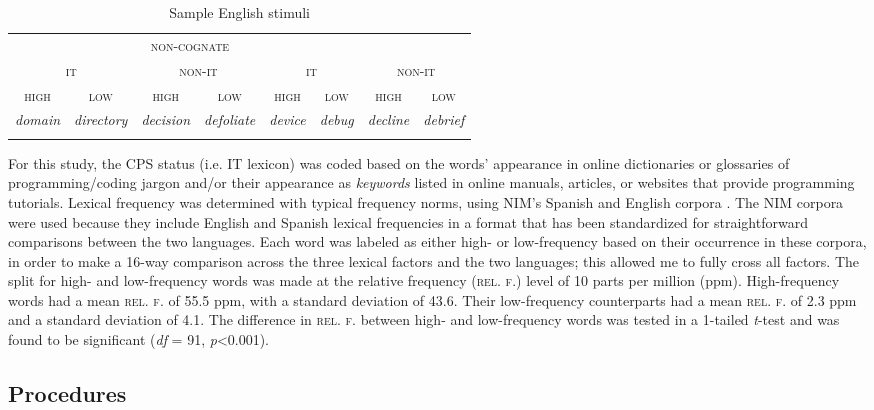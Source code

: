 \documentclass[output=paper,colorlinks,citecolor=brown,
]{langscibook}
\begin{document}
\begin{table}
\caption{Sample English stimuli}
\label{tab:gutierrez:stimuli}
 \begin{tabularx}{\textwidth}{cccccccc}
 \lsptoprule
 \multicolumn{4}{c}{\textsc{cognate}} & \multicolumn{4}{c}{\textsc{non-cognate}} \\ \cmidrule(lr){1-4}\cmidrule(lr){5-8} 
 \multicolumn{2}{c}{\textsc{it}} & \multicolumn{2}{c}{\textsc{non-it}} & \multicolumn{2}{c}{\textsc{it}} & \multicolumn{2}{c}{\textsc{non-it}} \\
 \cmidrule(lr){1-4}\cmidrule(lr){5-8} 
 \textsc{high} & \textsc{low} & \textsc{high} & \textsc{low} & \textsc{high} & \textsc{low} & \textsc{high} & \textsc{low} \\
 \textit{domain} & \textit{directory} & \textit{decision} & \textit{defoliate} & \textit{device} &  \textit{debug} & \textit{decline} & \textit{debrief} \\
 \lspbottomrule
 \end{tabularx}
\end{table}

For this study, the CPS status (i.e. IT lexicon) was coded based on the words' appearance in online dictionaries or glossaries of programming/coding jargon and/or their appearance as \emph{keywords} listed in online manuals, articles, or websites that provide programming tutorials. Lexical frequency was determined with typical frequency norms, using NIM's Spanish and English corpora \citep{guasch2013nim}. The NIM corpora were used because they include English and Spanish lexical frequencies in a format that has been standardized for straightforward comparisons between the two languages. Each word was labeled as either high- or low-frequency based on their occurrence in these corpora, in order to make a 16-way comparison across the three lexical factors and the two languages; this allowed me to fully cross all factors. The split for high- and low-frequency words was made at the relative frequency (\textsc{rel. f.}) level of 10 parts per million (ppm). High-frequency words had a mean \textsc{rel. f.} of 55.5 ppm, with a standard deviation of 43.6. Their low-frequency counterparts had a mean \textsc{rel. f.} of 2.3 ppm and a standard deviation of 4.1. The difference in \textsc{rel. f.} between high- and low-frequency words was tested in a 1-tailed \textit{t}-test and was found to be significant (\textit{df} = 91, \textit{p}<0.001).

\subsection{Procedures}
\end{document}
